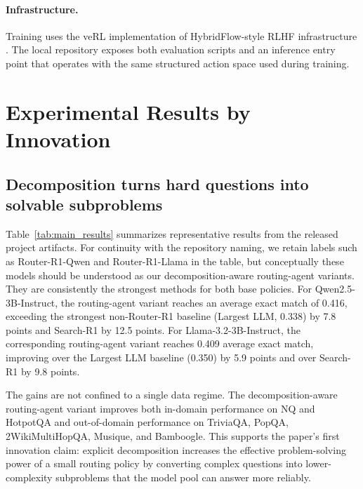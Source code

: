 \documentclass{article}
\begin{document}
\paragraph{Infrastructure.}
Training uses the veRL implementation of HybridFlow-style RLHF infrastructure \cite{sheng2024hybridflow}. The local repository exposes both evaluation scripts and an inference entry point that operates with the same structured action space used during training.

\section{Experimental Results by Innovation}
\label{sec:results}

\subsection{Decomposition turns hard questions into solvable subproblems}

Table~\ref{tab:main_results} summarizes representative results from the released project artifacts. For continuity with the repository naming, we retain labels such as Router-R1-Qwen and Router-R1-Llama in the table, but conceptually these models should be understood as our decomposition-aware routing-agent variants. They are consistently the strongest methods for both base policies. For Qwen2.5-3B-Instruct, the routing-agent variant reaches an average exact match of 0.416, exceeding the strongest non-Router-R1 baseline (Largest LLM, 0.338) by 7.8 points and Search-R1 by 12.5 points. For Llama-3.2-3B-Instruct, the corresponding routing-agent variant reaches 0.409 average exact match, improving over the Largest LLM baseline (0.350) by 5.9 points and over Search-R1 by 9.8 points.

The gains are not confined to a single data regime. The decomposition-aware routing-agent variant improves both in-domain performance on NQ and HotpotQA and out-of-domain performance on TriviaQA, PopQA, 2WikiMultiHopQA, Musique, and Bamboogle. This supports the paper's first innovation claim: explicit decomposition increases the effective problem-solving power of a small routing policy by converting complex questions into lower-complexity subproblems that the model pool can answer more reliably.
\end{document}
